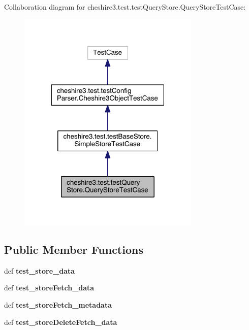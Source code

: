 Collaboration diagram for cheshire3.\-test.\-test\-Query\-Store.\-Query\-Store\-Test\-Case\-:
\nopagebreak
\begin{figure}[H]
\begin{center}
\leavevmode
\includegraphics[width=246pt]{classcheshire3_1_1test_1_1test_query_store_1_1_query_store_test_case__coll__graph}
\end{center}
\end{figure}
\subsection*{Public Member Functions}
\begin{DoxyCompactItemize}
\item 
\hypertarget{classcheshire3_1_1test_1_1test_query_store_1_1_query_store_test_case_a02ffed52bc7b101612d3b59f56a2e776}{def {\bfseries test\-\_\-store\-\_\-data}}\label{classcheshire3_1_1test_1_1test_query_store_1_1_query_store_test_case_a02ffed52bc7b101612d3b59f56a2e776}

\item 
\hypertarget{classcheshire3_1_1test_1_1test_query_store_1_1_query_store_test_case_a393e675ef5c68599ad49e0271f928b6b}{def {\bfseries test\-\_\-store\-Fetch\-\_\-data}}\label{classcheshire3_1_1test_1_1test_query_store_1_1_query_store_test_case_a393e675ef5c68599ad49e0271f928b6b}

\item 
\hypertarget{classcheshire3_1_1test_1_1test_query_store_1_1_query_store_test_case_a468bc4d7d569e6c2dfbdc15f31929b74}{def {\bfseries test\-\_\-store\-Fetch\-\_\-metadata}}\label{classcheshire3_1_1test_1_1test_query_store_1_1_query_store_test_case_a468bc4d7d569e6c2dfbdc15f31929b74}

\item 
\hypertarget{classcheshire3_1_1test_1_1test_query_store_1_1_query_store_test_case_abf3976082836aca9df4e1f72646a9300}{def {\bfseries test\-\_\-store\-Delete\-Fetch\-\_\-data}}\label{classcheshire3_1_1test_1_1test_query_store_1_1_query_store_test_case_abf3976082836aca9df4e1f72646a9300}

\end{DoxyCompactItemize}
